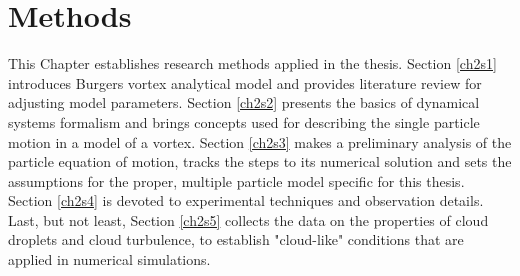 \documentclass[../main.tex]{subfiles}
\begin{document}
\chapter{Methods} %

\label{ch:methods} %


This Chapter establishes research methods applied in the thesis. Section \ref{ch2s1} introduces Burgers vortex analytical model and provides literature review for adjusting model parameters. Section \ref{ch2s2} presents the basics of dynamical systems formalism and  brings concepts used for describing the single particle motion in a model of a vortex.  Section \ref{ch2s3} makes a preliminary analysis of the particle equation of motion, tracks the steps to its numerical solution and sets the assumptions for the proper, multiple particle model specific for this thesis. Section \ref{ch2s4} is devoted to experimental techniques and observation details. Last, but not least, Section \ref{ch2s5} collects the data on the properties of cloud droplets and cloud turbulence, to establish "cloud-like" conditions that are applied in numerical simulations.
\end{document}
